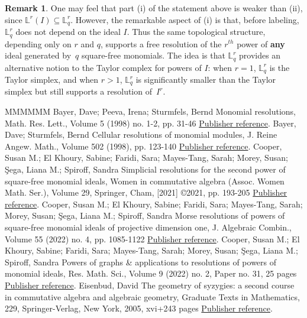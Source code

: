 \documentclass[11pt]{article}
\theoremstyle{definition}
\newtheorem{rema}[theo]{Remark}
\numberwithin{equation}{section}
\newcommand{\LL}{\mathbb{L}}
\newcommand{\Lrq}{\mathbb{L}^r_q}
\begin{document}
\begin{rema}
	One may feel that part \textup{(}i\textup{)} of the statement above is weaker than \textup{(}ii\textup{)}, since $\LL^r(I)\subseteq \Lrq$. However, the remarkable aspect of \textup{(}i\textup{)} is that, before labeling, $\Lrq$ does not depend on the ideal $I$. Thus the same topological structure, depending only on $r$ and $q$, supports a free resolution of the $r^{th}$ power of {\bf any} ideal generated by~$q$ square-free monomials. The idea is that $\Lrq$ provides an alternative notion to the Taylor complex for powers of $I$: when $r=1$, $\Lrq$ is the Taylor simplex, and when $r>1$, $\Lrq$ is significantly smaller than the Taylor simplex but still supports a resolution of~$I^r$. 
\end{rema}
\begin{thebibliography}{MMMMMM}
 Bayer, Dave; Peeva, Irena; Sturmfels, Bernd Monomial resolutions, Math. Res. Lett., Volume 5 (1998) no. 1-2, pp. 31-46 \href{https://alco.centre-mersenne.org/articles/10.5802/alco.325/#BPS}{Publisher reference}.
 Bayer, Dave; Sturmfels, Bernd Cellular resolutions of monomial modules, J. Reine Angew. Math., Volume 502 (1998), pp. 123-140 \href{https://alco.centre-mersenne.org/articles/10.5802/alco.325/#BS}{Publisher reference}.
 Cooper, Susan M.; El Khoury, Sabine; Faridi, Sara; Mayes-Tang, Sarah; Morey, Susan; Şega, Liana M.; Spiroff, Sandra Simplicial resolutions for the second power of square-free monomial ideals, Women in commutative algebra (Assoc. Women Math. Ser.), Volume 29, Springer, Cham, [2021] ©2021, pp. 193-205 \href{https://alco.centre-mersenne.org/articles/10.5802/alco.325/#L2}{Publisher reference}.
 Cooper, Susan M.; El Khoury, Sabine; Faridi, Sara; Mayes-Tang, Sarah; Morey, Susan; Şega, Liana M.; Spiroff, Sandra Morse resolutions of powers of square-free monomial ideals of projective dimension one, J. Algebraic Combin., Volume 55 (2022) no. 4, pp. 1085-1122 \href{https://alco.centre-mersenne.org/articles/10.5802/alco.325/#morse}{Publisher reference}.
 Cooper, Susan M.; El Khoury, Sabine; Faridi, Sara; Mayes-Tang, Sarah; Morey, Susan; Şega, Liana M.; Spiroff, Sandra Powers of graphs \& applications to resolutions of powers of monomial ideals, Res. Math. Sci., Volume 9 (2022) no. 2, Paper no. 31, 25 pages \href{https://alco.centre-mersenne.org/articles/10.5802/alco.325/#koszul}{Publisher reference}.
 Eisenbud, David The geometry of syzygies: a second course in commutative algebra and algebraic geometry, Graduate Texts in Mathematics, 229, Springer-Verlag, New York, 2005, xvi+243 pages \href{https://alco.centre-mersenne.org/articles/10.5802/alco.325/#E}{Publisher reference}.

\end{thebibliography}
\end{document}
